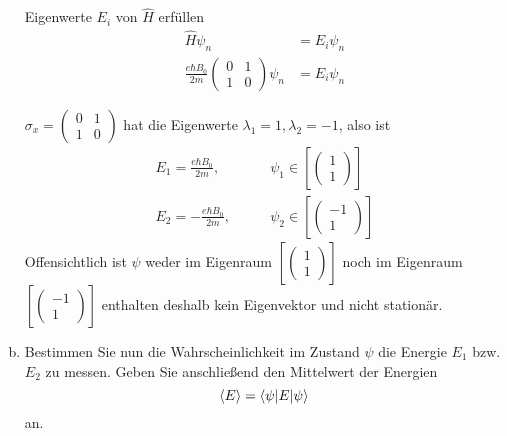 \documentclass{scrartcl}
\newcommand{\Sx}{\begin{pmatrix}0&1\\1&0\end{pmatrix}}
\newcommand{\vecz}[2]{\begin{pmatrix}#1 \\ #2\end{pmatrix}}
\begin{document}
\begin{enumerate}[a)]
Eigenwerte $E_i$ von $\hat  H$ erfüllen
\begin{align*}
\hat H \psi_n						&= E_i \psi_n			\\
\frac{e\hbar B_0}{2m}\Sx \psi_n
&= 
E_i \psi_n
\end{align*}

$\sigma_x = \begin{pmatrix}0&1\\1&0\end{pmatrix}$ hat die Eigenwerte $\lambda_1 = 1, \lambda_2 = -1$, also ist
\begin{align*}
E_1 =  \frac{e\hbar B_0}{2m}, \qquad& \psi_1 \in \left[\vecz 11 \right]\\
E_2 = -\frac{e\hbar B_0}{2m}, \qquad& \psi_2 \in \left[\vecz {-1}1 \right]
\end{align*}
Offensichtlich ist $\psi$ weder im Eigenraum $\left[\vecz 11 \right]$ noch im Eigenraum $\left[\vecz {-1}1 \right]$ enthalten deshalb kein Eigenvektor und nicht stationär.


\item Bestimmen Sie nun die Wahrscheinlichkeit im Zustand $\psi$ die Energie $E_1$ bzw. $E_2$ zu messen. Geben Sie anschließend den Mittelwert der Energien
\[\braket{E} = \braket{\psi|E|\psi}\]
an.



\end{enumerate}
\end{document}
